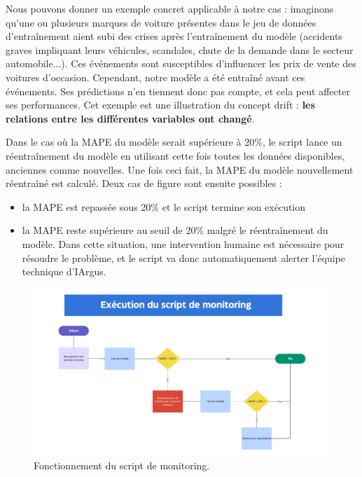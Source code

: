 \documentclass[french]{article}
\begin{document}
    Nous pouvons donner un exemple concret applicable à notre cas : imaginons qu'une ou plusieurs marques de voiture présentes dans le jeu de données d'entraînement aient subi des crises après l'entraînement du modèle (accidents graves impliquant leurs véhicules, scandales, chute de la demande dans le secteur automobile...). Ces événements sont susceptibles d'influencer les prix de vente des voitures d'occasion. Cependant, notre modèle a été entraîné avant ces événements. Ses prédictions n'en tiennent donc pas compte, et cela peut affecter ses performances. Cet exemple est une illustration du concept drift : \textbf{les relations entre les différentes variables ont changé}.

    

    Dans le cas où la MAPE du modèle serait supérieure à 20\%, le script lance un réentraînement du modèle en utilisant cette fois toutes les données disponibles, anciennes comme nouvelles. Une fois ceci fait, la MAPE du modèle nouvellement réentraîné est calculé. Deux cas de figure sont ensuite possibles :
    \begin{itemize}
        \item la MAPE est repassée sous 20\% et le script termine son exécution
        \item la MAPE reste supérieure au seuil de 20\% malgré le réentraînement du modèle. Dans cette situation, une intervention humaine est nécessaire pour résoudre le problème, et le script va donc automatiquement alerter l'équipe technique d'IArgus.
    \end{itemize}

    \begin{figure}[h!]
        \includegraphics[width=15cm]{monitoring}
        \centering
        \caption{Fonctionnement du script de monitoring.}
    \end{figure}
\end{document}
